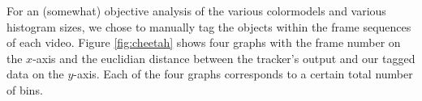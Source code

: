 \documentclass[11pt]{article}
\begin{document}
For an (somewhat) objective analysis of the various colormodels and various
histogram sizes, we chose to manually tag the objects within the frame
sequences of each video. Figure \ref{fig:cheetah} shows four graphs with the
frame number on the $x$-axis and the euclidian distance between the tracker's
output and our tagged data on the $y$-axis. Each of the four graphs corresponds
to a certain total number of bins.
\begin{figure}[!ht]
\centering
{}
\\
\subfigure[$15625$ bins]{
}
\end{figure}
\end{document}
